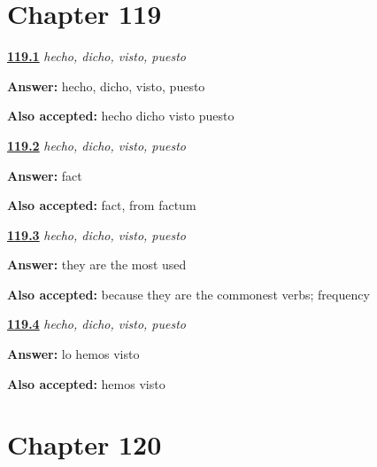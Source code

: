 \section*{Chapter 119}

\noindent\begin{minipage}[t]{\linewidth}
\raggedright
\hyperlink{review-ES-C49-participios-irregulares-four}{\textbf{119.1}} \emph{hecho, dicho, visto, puesto}\par
\small \textbf{Answer:} hecho, dicho, visto, puesto\par
\footnotesize \textbf{Also accepted:} hecho dicho visto puesto
\end{minipage}\par\medskip

\noindent\begin{minipage}[t]{\linewidth}
\raggedright
\hyperlink{review-ES-C49-participios-irregulares-fact}{\textbf{119.2}} \emph{hecho, dicho, visto, puesto}\par
\small \textbf{Answer:} fact\par
\footnotesize \textbf{Also accepted:} fact, from factum
\end{minipage}\par\medskip

\noindent\begin{minipage}[t]{\linewidth}
\raggedright
\hyperlink{review-ES-C49-participios-irregulares-why}{\textbf{119.3}} \emph{hecho, dicho, visto, puesto}\par
\small \textbf{Answer:} they are the most used\par
\footnotesize \textbf{Also accepted:} because they are the commonest verbs; frequency
\end{minipage}\par\medskip

\noindent\begin{minipage}[t]{\linewidth}
\raggedright
\hyperlink{review-ES-C49-participios-irregulares-use}{\textbf{119.4}} \emph{hecho, dicho, visto, puesto}\par
\small \textbf{Answer:} lo hemos visto\par
\footnotesize \textbf{Also accepted:} hemos visto
\end{minipage}\par\medskip

\section*{Chapter 120}

